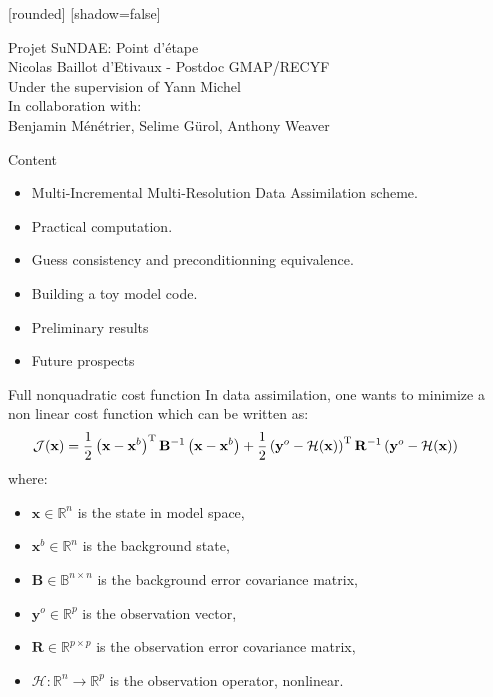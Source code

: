 \documentclass[8pt]{beamer}
\title[Nicolas Baillot d'Etivaux]{}
\begin{document}
[rounded]%
[shadow=false]


\begin{frame}
\begin{center}
 \Huge{Projet SuNDAE: Point d'étape}\\
 \vspace{+2cm}
 \Large{Nicolas Baillot d'Etivaux - Postdoc GMAP/RECYF}\\
 \Large{Under the supervision of Yann Michel}\\
 \vspace{+0.5cm}
 \Large{In collaboration with:\\ Benjamin Ménétrier, Selime Gürol, Anthony Weaver}
\end{center}
\end{frame}


\begin{frame}{Content}
 \begin{itemize}
  \item Multi-Incremental Multi-Resolution Data Assimilation scheme.
  \item Practical computation.
  \item Guess consistency and preconditionning equivalence.
  \item Building a toy model code.
  \item Preliminary results
  \item Future prospects
 \end{itemize}
\end{frame}


\begin{frame}{Full nonquadratic cost function}
In data assimilation, one wants to minimize a non linear cost function which can be written as:
\begin{align}
\hspace{-0.7cm} \mathcal{J}(\mathbf{x}) = \frac{1}{2} \left(\mathbf{x}-\mathbf{x}^b\right)^\mathrm{T} \mathbf{B}^{-1} \left(\mathbf{x}-\mathbf{x}^b\right) + \frac{1}{2} \left(\mathbf{y}^o-\mathcal{H}(\mathbf{x})\right)^\mathrm{T} \mathbf{R}^{-1} \left(\mathbf{y}^o-\mathcal{H}(\mathbf{x})\right)
\end{align}
where:
\begin{itemize}
\item $\mathbf{x} \in \mathbb{R}^n$ is the state in model space,
\item $\mathbf{x}^b \in \mathbb{R}^n$ is the background state,
\item $\mathbf{B} \in \mathbb{B}^{n \times n}$ is the background error covariance matrix,
\item $\mathbf{y}^o \in \mathbb{R}^p$ is the observation vector,
\item $\mathbf{R} \in \mathbb{R}^{p \times p}$ is the observation error covariance matrix,
\item $\mathcal{H} : \mathbb{R}^n \rightarrow \mathbb{R}^p$ is the observation operator, nonlinear.
\end{itemize}
\end{frame}
\end{document}
